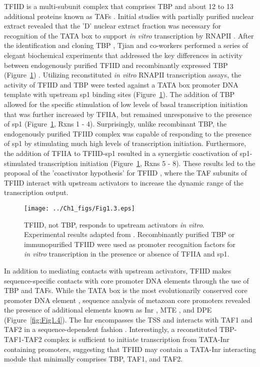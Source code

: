 TFIID is a multi-subunit complex that comprises TBP and about 12 to 13 additional proteins known as TAFs \cite{Burley_3049}. Initial studies with partially purified nuclear extract revealed that the 'D' nuclear extract fraction was necessary for recognition of the TATA box to support \emph{in vitro} transcription by RNAPII \cite{Matsui_3980}. After the identification and cloning TBP \cite{Buratowski_1988}, Tjian and co-workers performed a series of elegant biochemical experiments that addressed the key differences in activity between endogenously purified TFIID and recombinantly expressed TBP  (Figure~\ref{fig:Fig1.3})  \cite{Dynlacht_3551,Pugh_3586}. Utilizing reconstituted \emph{in vitro} RNAPII transcription assays, the activity of TFIID and TBP were tested against a TATA box promoter DNA template with upstream sp1 binding sites (Figure~\ref{fig:Fig1.3}). The addition of TBP allowed for the specific stimulation of low levels of basal transcription initiation that was further increased by TFIIA, but remained unresponsive to the presence of sp1 (Figure~\ref{fig:Fig1.3}, Rxns 1 - 4). Surprisingly, unlike recombinant TBP, the endogenously purified TFIID complex was capable of responding to the presence of sp1 by stimulating much high levels of transcription initiation.  Furthermore, the addition of TFIIA to TFIID-sp1 resulted in a synergistic coactivation of sp1-stimulated transcription initiation (Figure~\ref{fig:Fig1.3}, Rxns 5 - 8). These results led to the proposal of the 'coactivator hypothesis' for TFIID \cite{Pugh_3586}, where the TAF subunits of TFIID interact with upstream activators to increase the dynamic range of the transcription output. \\
\begin{figure}
\centering
\texttt{[image: ../Ch1\_figs/Fig1.3.eps]}
\caption[TFIID, not TBP, responds to upstream activators \emph{in vitro}]{TFIID, not TBP, responds to upstream activators \emph{in vitro}. Experimental results adapted from \cite{Dynlacht_3551,Pugh_3586}. Recombinantly purified TBP or immunopurified TFIID were used as promoter recognition factors for \emph{in vitro} transcription in the presence or absence of TFIIA and sp1.} 
\label{fig:Fig1.3}
\end{figure}
\indent In addition to mediating contacts with upstream activators, TFIID makes sequence-specific contacts with core promoter DNA elements through the use of TBP and TAFs. While the TATA box is the most evolutionarily conserved core promoter DNA element \cite{Juven-Gershon_468}, sequence analysis of metazoan core promoters revealed the presence of additional elements known as Inr \cite{Smale_3697}, MTE \cite{Lim_1522}, and DPE \cite{Burke_3081} (Figure~\ref{fig:Fig1.4}). The Inr encompasses the TSS and interacts with TAF1 and TAF2 in a sequence-dependent fashion \cite{Chalkley_2339,Verrijzer_3120}. Interestingly, a reconstituted TBP-TAF1-TAF2 complex is sufficient to initiate transcription from TATA-Inr containing promoters, suggesting that TFIID may contain a TATA-Inr interacting module that minimally comprises TBP, TAF1, and TAF2. \\
